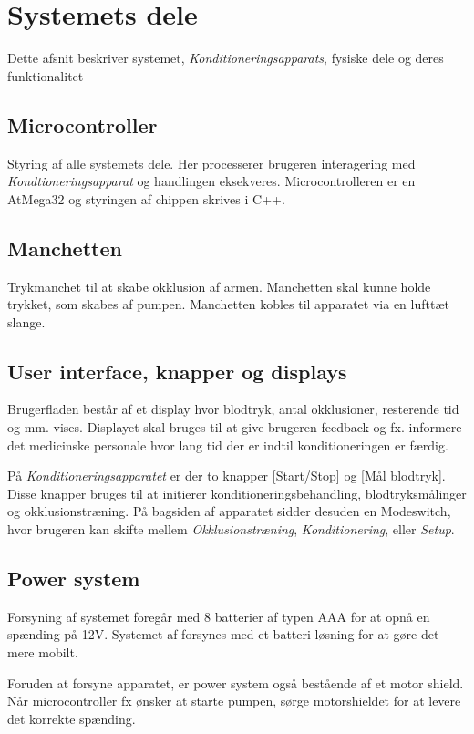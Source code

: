 \chapter{Systemets dele} \label{title:systemPart}
Dette afsnit beskriver systemet, \textit{Konditioneringsapparats}, fysiske dele og deres funktionalitet

\section{Microcontroller}
Styring af alle systemets dele. Her processerer brugeren interagering med \textit{Kondtioneringsapparat} og handlingen eksekveres. Microcontrolleren er en AtMega32 og styringen af chippen skrives i C++.

\section{Manchetten}
Trykmanchet til at skabe okklusion af armen. Manchetten skal kunne holde trykket, som skabes af pumpen. Manchetten kobles til apparatet via en lufttæt slange. 

\section{User interface, knapper og displays}
Brugerfladen består af et display hvor blodtryk, antal okklusioner, resterende tid og mm. vises. Displayet skal bruges til at give brugeren feedback og fx. informere det medicinske personale hvor lang tid der er indtil konditioneringen er færdig. 

På \textit{Konditioneringsapparatet} er der to knapper [Start/Stop] og [Mål blodtryk]. Disse knapper bruges til at initierer konditioneringsbehandling, blodtryksmålinger og okklusionstræning. På bagsiden af apparatet sidder desuden en Modeswitch, hvor brugeren kan skifte mellem \textit{Okklusionstræning}, \textit{Konditionering}, eller \textit{Setup}. 

\section{Power system}
Forsyning af systemet foregår med 8 batterier af typen AAA for at opnå en spænding på 12V. Systemet af forsynes med et batteri løsning for at gøre det mere mobilt.  

Foruden at forsyne apparatet, er power system også bestående af et motor shield. Når microcontroller fx ønsker at starte pumpen, sørge motorshieldet for at levere det korrekte spænding. 

